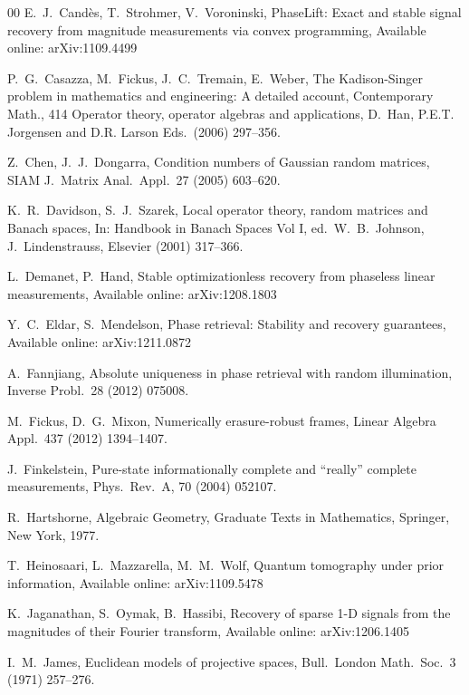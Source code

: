 \documentclass[times,10pt]{elsarticle}
\theoremstyle{plain}
\begin{document}
\begin{thebibliography}{00}
E.\ J.\ Cand\`{e}s, T.\ Strohmer, V.\ Voroninski,
PhaseLift: Exact and stable signal recovery from magnitude measurements via convex programming,
Available online: arXiv:1109.4499

P.\ G.\ Casazza, M.\ Fickus, J.\ C.\ Tremain, E.\ Weber, 
The Kadison-Singer problem in mathematics and engineering: A detailed account, 
Contemporary Math., 414 Operator theory, operator algebras and applications, D.\ Han, P.E.T. Jorgensen and D.R. Larson Eds.\ (2006) 297--356.

Z.\ Chen, J.\ J.\ Dongarra,
Condition numbers of Gaussian random matrices,
SIAM J.\ Matrix Anal.\ Appl.\ 27 (2005) 603--620.

K.\ R.\ Davidson, S.\ J.\ Szarek,
Local operator theory, random matrices and Banach spaces,
In: Handbook in Banach Spaces Vol I, ed.\ W.\ B.\ Johnson, J.\ Lindenstrauss, Elsevier (2001) 317--366.

L.\ Demanet, P.\ Hand, 
Stable optimizationless recovery from phaseless linear measurements, 
Available online: arXiv:1208.1803

Y.\ C.\ Eldar, S.\ Mendelson,
Phase retrieval: Stability and recovery guarantees, 
Available online: arXiv:1211.0872

A.\ Fannjiang,
Absolute uniqueness in phase retrieval with random illumination,
Inverse Probl.\ 28 (2012) 075008.

M.\ Fickus, D.\ G.\ Mixon,
Numerically erasure-robust frames,
Linear Algebra Appl.\ 437 (2012) 1394--1407.

J.\ Finkelstein,
Pure-state informationally complete and ``really'' complete measurements,
Phys.\ Rev.\ A, 70 (2004) 052107.

R.\ Hartshorne,
Algebraic Geometry,
Graduate Texts in Mathematics, Springer, New York, 1977.

T.\ Heinosaari, L.\ Mazzarella, M.\ M.\ Wolf,
Quantum tomography under prior information,
Available online: arXiv:1109.5478

K.\ Jaganathan, S.\ Oymak, B.\ Hassibi,
Recovery of sparse 1-D signals from the magnitudes of their Fourier transform,
Available online: arXiv:1206.1405

I.\ M.\ James,
Euclidean models of projective spaces,
Bull.\ London Math.\ Soc.\ 3 (1971) 257--276. 


\end{thebibliography}
\end{document}
